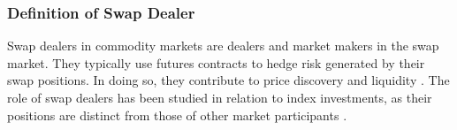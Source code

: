 

\subsubsection*{Definition of Swap Dealer}
Swap dealers in commodity markets are dealers and market makers in the swap market. They typically use futures contracts to hedge risk generated by their swap positions. In doing so, they contribute to price discovery and liquidity \citep{brunetti2016}.  The role of swap dealers has been studied  in relation to index investments, as their positions are distinct from those of other market participants \citep{sanders2016}. 

